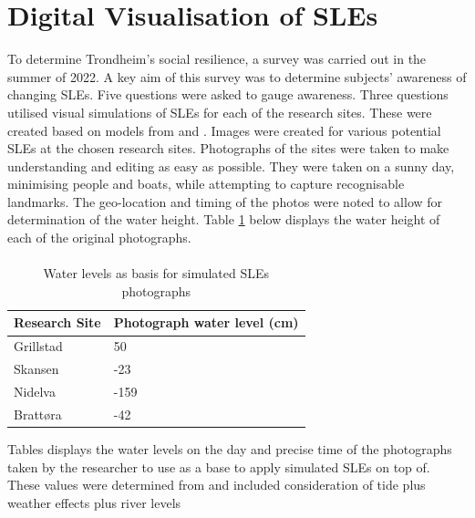\section{Digital Visualisation of SLEs}
To determine Trondheim's social resilience, a survey was carried out in the summer of 2022. A key aim of this survey was to determine subjects' awareness of changing SLEs.  Five questions were asked to gauge awareness. Three questions utilised visual simulations of SLEs for each of the research sites. These were created based on models from \cite{dsb_integrating-sea-level-rise-and-storm-surges--local-planningpdf_2017} and \cite{kartverket_se_2021}. Images were created for various potential SLEs at the chosen research sites. Photographs of the sites were taken to make understanding and editing as easy as possible. They were taken on a sunny day, minimising people and boats, while attempting to capture recognisable landmarks. The geo-location and timing of the photos were noted to allow for determination of the water height. Table \ref{tab:water_level_photo} below displays the water height of each of the original photographs. 
\paragraph{}

\begin{table}[H]
    \centering
    \begin{tabular}{|l|l|}
        \hline
     	\textbf{Research Site} & \textbf{Photograph water level (cm)} \\ \hline
            Grillstad & 50 \\ \hline
            Skansen & -23 \\ \hline
            Nidelva & -159 \\ \hline
            Brattøra	& -42 \\ \hline
    \end{tabular}
    \caption{Water levels as basis for simulated SLEs photographs}{Tables displays the water levels on the day and precise time of the photographs taken by the researcher to use as a base to apply simulated SLEs on top of. These values were determined from \cite{tides_high_2022} and included consideration of tide plus weather effects plus river levels}
    \label{tab:water_level_photo}
\end{table}
\paragraph{}

